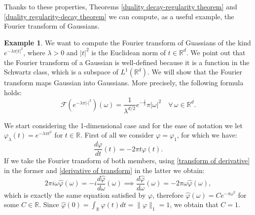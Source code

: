 \documentclass[corpo=11pt, stile=classica, tipotesi=custom,
greek, evenboxes, english]{toptesi}
\numberwithin{equation}{chapter}
\theoremstyle{definition}
\newtheorem{es}[teo]{Example}
\theoremstyle{remark}
\newcommand{\R}{\mathbb{R}} %
\newcommand{\F}{\mathscr{F}} %
\begin{document}
Thanks to these properties, Theorems \ref{duality decay-regularity theorem} and \ref{duality regularity-decay theorem} we can compute, as a useful example, the Fourier transform of Gaussians.
\begin{es}\label{Fourier transform of Gaussian proposition}
	We want to compute the Fourier transform of Guassians of the kind $e^{-\lambda \pi |t|^2}$, where $\lambda > 0$ and $|t|^2$ is the Euclidean norm of $t \in \R^d$. We point out that the Fourier transform of a Gaussian is well-defined because it is a function in the Schwartz class, which is a subspace of $L^1(\R^d)$. We will show that the Fourier transform maps Gaussian into Gaussians. More precisely, the following formula holds:
	\begin{equation}\label{Fourier transform of Gaussian formula}
		\F(e^{-\lambda \pi |\cdot|^2})(\omega) = \dfrac{1}{\lambda^{d/2}} e^{-\frac{1}{\lambda}}\pi |\omega|^2 \quad \forall\,\omega \in \R^d.
	\end{equation}

	We start considering the 1-dimensional case and for the ease of notation we let $\varphi_{\lambda}(t) = e^{-\lambda \pi t^2}$ for $t \in \R$.	First of all we consider $\varphi = \varphi_1$, for which we have:
	\begin{equation*}
		\frac{d \varphi}{dt}(t) = -2 \pi t \varphi(t).
	\end{equation*}
	If we take the Fourier transform of both members, using \eqref{transform of derivative} in the former and \eqref{derivative of transform} in the latter we obtain:
	\begin{equation*}
		2 \pi i \omega \hat{\varphi}(\omega) = -i \dfrac{d\hat{\varphi}}{d\omega}(\omega) \implies \dfrac{d\hat{\varphi}}{d\omega}(\omega) = - 2 \pi \omega \hat{\varphi}(\omega),
	\end{equation*}
	which is exactly the same equation satisfied by $\varphi$, therefore $\hat{\varphi}(\omega) = C e^{-\pi \omega^2}$ for some $C \in \R$. Since $\hat{\varphi}(0) = \int_\R \varphi(t)dt = \|\varphi\|_1=1$, we obtain that $C=1$.
	

\end{es}
\end{document}
